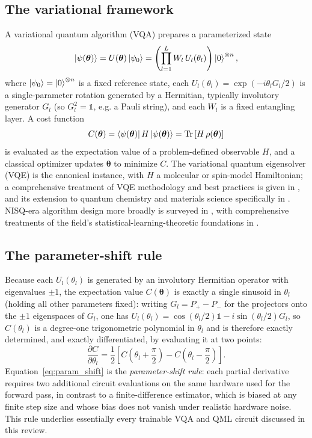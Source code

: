 \documentclass[11pt]{article}
\begin{document}
\subsection{The variational framework}
A variational quantum algorithm (VQA) \cite{Cerezo2021} prepares a parameterized state
\begin{equation}
\ket{\psi(\bm{\theta})} = U(\bm{\theta})\ket{\psi_0} = \left(\prod_{l=1}^{L} W_l\, U_l(\theta_l)\right)\ket{0}^{\otimes n},
\end{equation}
where $\ket{\psi_0}=\ket{0}^{\otimes n}$ is a fixed reference state, each $U_l(\theta_l)=\exp(-i\theta_l G_l/2)$ is a single-parameter rotation generated by a Hermitian, typically involutory generator $G_l$ (so $G_l^2=\mathbb{1}$, e.g. a Pauli string), and each $W_l$ is a fixed entangling layer. A cost function
\begin{equation}
C(\bm{\theta}) = \bra{\psi(\bm{\theta})} H \ket{\psi(\bm{\theta})} = \Tr\left[H\,\rho(\bm{\theta})\right]
\end{equation}
is evaluated as the expectation value of a problem-defined observable $H$, and a classical optimizer updates $\bm{\theta}$ to minimize $C$. The variational quantum eigensolver (VQE) \cite{Peruzzo2014} is the canonical instance, with $H$ a molecular or spin-model Hamiltonian; a comprehensive treatment of VQE methodology and best practices is given in \cite{Tilly2022}, and its extension to quantum chemistry and materials science specifically in \cite{Bauer2020}. NISQ-era algorithm design more broadly is surveyed in \cite{Bharti2022}, with comprehensive treatments of the field's statistical-learning-theoretic foundations in \cite{Zaman2023,Wang2024QML}.

\subsection{The parameter-shift rule}
Because each $U_l(\theta_l)$ is generated by an involutory Hermitian operator with eigenvalues $\pm 1$, the expectation value $C(\bm{\theta})$ is exactly a single sinusoid in $\theta_l$ (holding all other parameters fixed): writing $G_l = P_+ - P_-$ for the projectors onto the $\pm1$ eigenspaces of $G_l$, one has $U_l(\theta_l) = \cos(\theta_l/2)\mathbb{1} - i\sin(\theta_l/2)G_l$, so $C(\theta_l)$ is a degree-one trigonometric polynomial in $\theta_l$ and is therefore exactly determined, and exactly differentiated, by evaluating it at two points:
\begin{equation}
\frac{\partial C}{\partial \theta_l} = \frac{1}{2}\left[C\!\left(\theta_l + \frac{\pi}{2}\right) - C\!\left(\theta_l - \frac{\pi}{2}\right)\right].
\label{eq:param_shift}
\end{equation}
Equation~\eqref{eq:param_shift} is the \emph{parameter-shift rule}: each partial derivative requires two additional circuit evaluations on the same hardware used for the forward pass, in contrast to a finite-difference estimator, which is biased at any finite step size and whose bias does not vanish under realistic hardware noise. This rule underlies essentially every trainable VQA and QML circuit discussed in this review.
\end{document}
